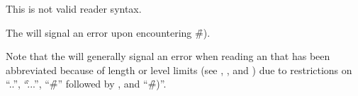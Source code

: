 
This is not valid reader syntax.

The  will signal an error 
upon encountering \f{\#)}.

\endsubsubsection%

\endsubsection%


Note that the  will 
generally
signal an error 
when reading an  that has been
abbreviated because of length or level limits 
(see ,
     ,
 and )
due to restrictions on ``..'', ``\f{...}'', ``\f{\#}'' followed by ,
and ``\f{\#)}''.

\endsubsection%
